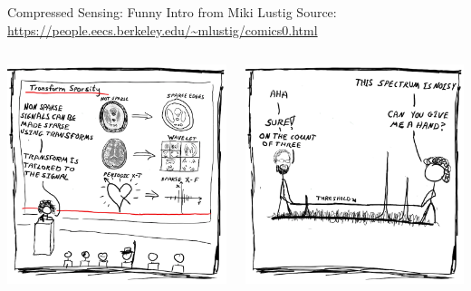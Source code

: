 \documentclass[aspectratio=169]{beamer}
\begin{document}
	\begin{frame}{Compressed Sensing: Funny Intro from Miki Lustig}
		Source: \url{https://people.eecs.berkeley.edu/~mlustig/comics0.html}
		\vspace{1em}
		\begin{columns}
			\centering
			\includegraphics[width=\columnwidth]{figures/cs-lustig-comics-09.png}
			
			\centering
			\includegraphics[width=\columnwidth]{figures/cs-lustig-comics-10.png}
		\end{columns}
	\end{frame}
	
\end{document}
